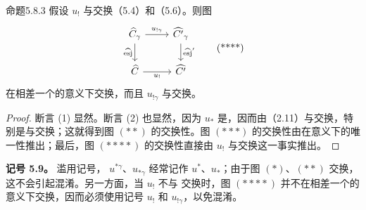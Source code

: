 \begin{SGAresult}{命题}{5.8.3}
假设 $u_!$ 与交换（5.4）和（5.6）。则图
\[\begin{tikzcd}\widehat C_\gamma\arrow[r,"u_{!\gamma}"]\arrow[d,"\widehat{\mathrm{esj}}"']&\widehat{C'}_\gamma\arrow[d,"\widehat{\mathrm{esj}}'"]\\\widehat C\arrow[r,"u_!"']&\widehat{C'}\end{tikzcd}\tag{****}\]
在相差一个的意义下交换，而且 $u_{!\gamma}$ 与交换。
\end{SGAresult}
\begin{proof}
断言 (1) 显然。断言 (2) 也显然，因为 $u_*$ 是，因而由（2.11）与交换，特别是与交换；这就得到图 $(**)$ 的交换性。图 $(***)$ 的交换性由在意义下的唯一性推出；最后，图 $(****)$ 的交换性直接由 $u_!$ 与交换这一事实推出。
\end{proof}
\textbf{记号 5.9。} 滥用记号， $u^{*\gamma}$、$u_{*\gamma}$ 经常记作 $u^*$、$u_*$；由于图 $(*)$、$(**)$ 交换，这不会引起混淆。另一方面，当 $u_!$ 不与
交换时，图 $(****)$ 并不在相差一个的意义下交换，因而必须使用记号 $u_!$ 和 $u_{!\gamma}$，以免混淆。

